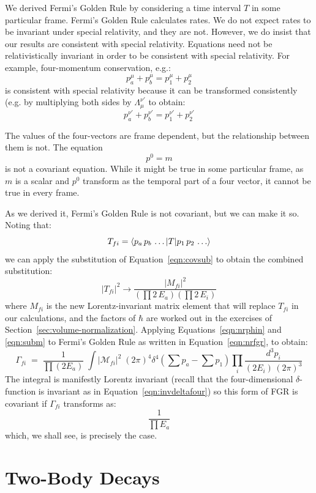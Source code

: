 \documentclass[12pt]{article}
\begin{document}
We derived Fermi's Golden Rule by considering a time interval $T$ in
some particular frame.  Fermi's Golden Rule calculates rates.  We do
not expect rates to be invariant under special relativity, and they
are not.  However, we do insist that our results are consistent with
special relativity.  Equations need not be relativistically invariant
in order to be consistent with special relativity.  For example,
four-momentum conservation, e.g.:
$$p_a^\mu + p_b^\mu = p_1^\mu + p_2^\mu$$
is consistent with special relativity because it can be transformed
consistently (e.g. by multiplying both sides by $\Lambda^{\nu'}_\mu$
to obtain:
$$p_a^{\nu'} + p_b^{\nu'} = p_1^{\nu'} + p_2^{\nu'}$$

The values of the four-vectors are frame dependent, but the
relationship between them is not.  The equation
$$p^0 = m$$
is not a covariant equation.  While it might be true in some
particular frame, as $m$ is a scalar and $p^0$ transform as the
temporal part of a four vector, it cannot be true in every frame.

As we derived it, Fermi's Golden Rule is not covariant, but we can
make it so.  Noting that:
$$T_{fi} = \braket{p_a \, p_b \, \ldots | T | p_1 \, p_2 \, \ldots}$$
we can apply the substitution of Equation~\ref{eqn:covsub} to obtain the combined substitution:
\begin{equation}
 \label{eqn:subm}
 |T_{fi}|^2 \to \frac{|M_{fi}|^2}{\left( \prod 2\,E_a \right) \left( \prod 2\,E_i \right)}
\end{equation}
where $M_{fi}$ is the new Lorentz-invariant matrix element that will replace $T_{fi}$ in our calculations, and the factors of $\hbar$ are worked out in the exercises of Section~\ref{sec:volume-normalization}.  Applying Equations~\ref{eqn:nrphin} and \ref{eqn:subm} to Fermi's Golden Rule as written in Equation~\ref{eqn:nrfgr}, to obtain:
\begin{equation}
\label{eqn:covfgr}
\Gamma_{fi} \; = \; \frac{1}{\prod (2 E_a)} \; \int |\mathcal{M}_{fi}|^2 \; (2\pi)^4 \delta^4(\sum p_a - \sum p_1)
\prod_i \frac{d^3p_i}{(2 E_i) \, (2\pi)^3 }
\end{equation}
The integral is manifestly Lorentz invariant (recall that the four-dimensional $\delta$-function is invariant as in Equation~\ref{eqn:invdeltafour}) so this form of FGR is covariant if $\Gamma_{fi}$ transforms as:
$$\frac{1}{\prod E_a}$$
which, we shall see, is precisely the case.

\section{Two-Body Decays}
\end{document}
